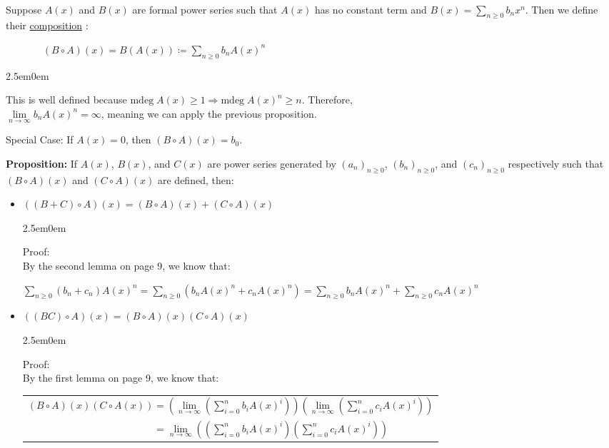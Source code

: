 \documentclass{book}
\newcommand{\hTwo}{%
\color{MidnightBlue}%
   \fontsize{13}{15}\selectfont%
}
\newcommand{\exOne}{%
   \color{Purple}%
   \fontsize{13}{15}\selectfont%
}
\newcommand{\exTwoP}{%
   \color{RedViolet}%
   \fontsize{13}{15}\selectfont%
}
\newcommand{\exPP}{%
   \color{RedViolet}%
   \fontsize{12}{14}\selectfont%
}
\newenvironment{myIndent}{%
   \begin{adjustwidth}{2.5em}{0em}%
}{%
   \end{adjustwidth}%
}
\newcommand{\udefine}[1]{{%
   \setulcolor{Red}%
   \setul{0.14em}{0.07em}%
   \ul{#1}%
}}
\newcommand{\blab}[1]{\textbf{#1}}
\newcommand{\mdeg}{\mathrm{mdeg}\phantom{.}}
\newcommand{\mySepTwo}[1][.]{%
   {\noindent\color{#1}{\rule{6.5in}{0.5mm}}}\\%
}
\newcommand{\retTwo}{\hfill\bigbreak}
\begin{document}
\mySepTwo

Suppose $A(x)$ and $B(x)$ are formal power series such that $A(x)$ has no constant term and $B(x) = \sum\limits_{n \geq 0}b_n x^n$. Then we define their \udefine{composition}: \\ [-12pt]

{\centering $\phantom{aaaaaaa}(B \circ A)(x) = B(A(x)) \coloneq \sum\limits_{n \geq 0}b_n A(x)^n$ \retTwo\par}

\begin{myIndent}\hTwo
   This is well defined because $\mdeg A(x) \geq 1 \Longrightarrow \mdeg A(x)^n \geq n$. Therefore,\\ $\lim\limits_{n \rightarrow \infty} b_n A(x)^n = \infty$, meaning we can apply the previous proposition.\retTwo

   Special Case: If $A(x) = 0$, then $(B \circ A)(x) = b_0$.\retTwo

   \exOne\blab{Proposition:} If $A(x)$, $B(x)$, and $C(x)$ are power series generated by $(a_n)_{n \geq 0}$, $(b_n)_{n \geq 0}$, and $(c_n)_{n \geq 0}$ respectively such that $(B \circ A)(x)$ and $(C \circ A)(x)$ are defined, then:
   
   \begin{itemize}
      \item $((B + C) \circ A)(x) = (B \circ A)(x) + (C \circ A)(x)$
      
      \begin{myIndent}\exTwoP
         Proof:\\
         By the second lemma on page 9, we know that:\\\exPP
         $\sum\limits_{n \geq 0}(b_n + c_n)A(x)^n  = \sum\limits_{n \geq 0}(b_n A(x)^n + c_n A(x)^n) = \sum\limits_{n \geq 0}b_n A(x)^n + \sum\limits_{n \geq 0}c_n A(x)^n$
         \retTwo
      \end{myIndent}

      \item $((BC) \circ A)(x) = (B \circ A)(x)(C \circ A)(x)$\newpage
      
      \begin{myIndent}\exTwoP
         Proof:\\
         By the first lemma on page 9, we know that:

         {\centering\exPP 
         \begin{tabular}{l}
            $(B \circ A)(x)(C \circ A(x)) = \left(\lim\limits_{n \rightarrow \infty}\left(\sum\limits_{i = 0}^n b_i A(x)^i\right)\right)\left(\lim\limits_{n \rightarrow \infty}\left(\sum\limits_{i = 0}^n c_i A(x)^i\right)\right)$\\ [10pt] $\phantom{(B \circ A)(x)(C \circ A(x))} = \lim\limits_{n \rightarrow \infty}\left(\left(\sum\limits_{i = 0}^n b_iA(x)^i\right)\left(\sum\limits_{i = 0}^n c_iA(x)^i\right)\right)$
         \end{tabular} \retTwo\par}


\end{myIndent}
\end{itemize}
\end{myIndent}
\end{document}
